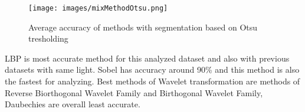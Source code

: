 \documentclass{article}
\begin{document}
\begin{figure}[!htbp]
    \centering
    \texttt{[image: images/mixMethodOtsu.png]}
    \caption{Average accuracy of methods with segmentation based on Otsu tresholding}
\end{figure}

LBP is most accurate method for this analyzed dataset and also with previous datasets with same light. Sobel has accuracy around 90\% and this method is also the fastest for analyzing. Best methods of Wavelet transformation are methods of Reverse Biorthogonal Wavelet Family and Birthogonal Wavelet Family, Daubechies are overall least accurate.
\end{document}
